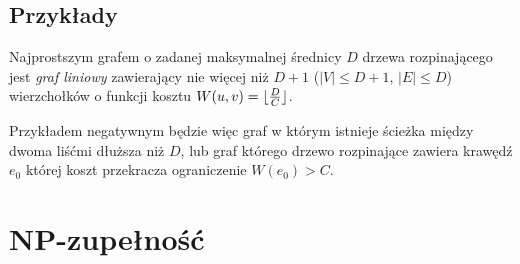 \subsection{Przykłady}

Najprostszym grafem o zadanej maksymalnej średnicy $D$ drzewa rozpinającego jest \textit{graf liniowy} zawierający nie więcej niż $D + 1$ ($|V| \leq D + 1$, $|E| \leq D$) wierzchołków o funkcji kosztu $W(u, v) = \lfloor\frac{D}{C}\rfloor$.

Przykładem negatywnym będzie więc graf w którym istnieje ścieżka między dwoma liśćmi dłuższa niż $D$, lub graf którego drzewo rozpinające zawiera krawędź $e_0$ której koszt przekracza ograniczenie $W(e_0) > C$.

\section{NP-zupełność}

